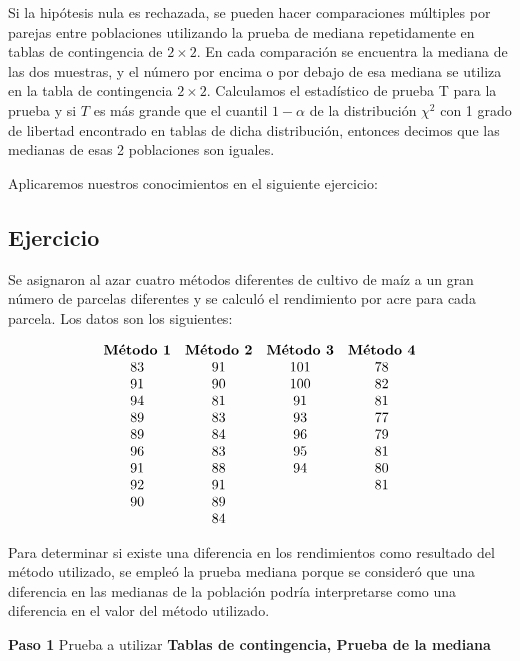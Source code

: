 \documentclass[
  a4paper,
  oneside,
  openany]{book}
\begin{document}
Si la hipótesis nula es rechazada, se pueden hacer comparaciones múltiples por parejas entre poblaciones utilizando la prueba de mediana repetidamente en tablas de contingencia de \(2 \times 2\). En cada comparación se encuentra la mediana de las dos muestras, y el número por encima o por debajo de esa mediana se utiliza en la tabla de contingencia \(2 \times 2\). Calculamos el estadístico de prueba T para la prueba y si \(T\) es más grande que el cuantil \(1-\alpha\) de la distribución \(\chi^2\) con 1 grado de libertad encontrado en tablas de dicha distribución, entonces decimos que las medianas de esas 2 poblaciones son iguales.

Aplicaremos nuestros conocimientos en el siguiente ejercicio:

\hypertarget{ejercicio-2}{%
\subsection{Ejercicio}\label{ejercicio-2}}

Se asignaron al azar cuatro métodos diferentes de cultivo de maíz a un gran número de parcelas diferentes y se calculó el rendimiento por acre para cada parcela. Los datos son los siguientes:

\[
\begin{array}{ c c c c c } 
\textbf{Método 1} & \textbf{Método 2} & \textbf{Método 3} & \textbf{Método 4} \\ 
83 & 91 &101  &78  \\ 
91 & 90 &100 &82 \\
94 & 81 &91  &81  \\
89 & 83 &93  &77  \\
89 & 84 &96  &79 \\
96 & 83 &95 &81 \\
91 & 88 &94  &80 \\
92 & 91 & & 81 \\
90 & 89 & &  \\
   & 84 &  &  \\
\end{array}
\]

Para determinar si existe una diferencia en los rendimientos como resultado del método utilizado, se empleó la prueba mediana porque se consideró que una diferencia en las medianas de la población podría interpretarse como una diferencia en el valor del método utilizado.

\textbf{Paso 1} Prueba a utilizar \textbf{Tablas de contingencia, Prueba de la mediana}
\end{document}

